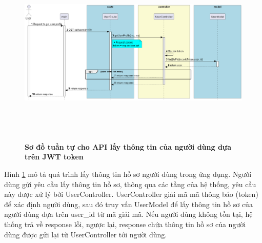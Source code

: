 \begin{figure}[H]
  \centering
  \includegraphics[width=16cm,height=9cm]{Images/server/sequence/server/getUserProfile.png}
  \caption[Sơ đồ tuần tự cho API lấy thông tin của người dùng dựa trên JWT token ]{\bfseries \fontsize{12pt}{0pt}
  \selectfont Sơ đồ tuần tự cho API lấy thông tin của người dùng dựa trên JWT token }
  \label{getUserProfile} %
\end{figure}
Hình \ref{getUserProfile} mô tả quá trình lấy thông tin hồ sơ người dùng trong ứng dụng. Người dùng gửi yêu cầu lấy thông tin hồ sơ, thông qua các tầng của hệ thống, yêu cầu này được xử lý bởi UserController. UserController giải mã mã thông báo (token) để xác định người dùng, sau đó truy vấn UserModel để lấy thông tin hồ sơ của người dùng dựa trên user\_id từ mã giải mã. Nếu người dùng không tồn tại, hệ thống trả về response lỗi, ngược lại, response chứa thông tin hồ sơ của người dùng được gửi lại từ UserController tới người dùng.






